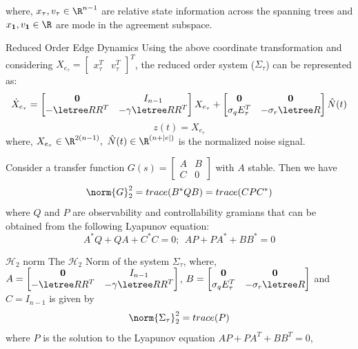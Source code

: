 \begin{frame}
\begin{lemma}
					where, $x_\tau,v_\tau \in \R^{n-1}$ are relative state information across the spanning trees and $x_{\mathbf{1}}, v_{\mathbf{1}} \in \R$ are mode in the agreement subspace. 
				\end{lemma}	
				\begin{block}{Reduced Order Edge Dynamics}
					 Using the above coordinate transformation and considering ${X}_{e_\tau}=\begin{bmatrix}
					 	x_\tau^T & v_\tau^T \end{bmatrix}^T$, the reduced order system ($\Sigma_{\tau}$) can be represented as:
					$$\dot{X}_{e_\tau}=\begin{bmatrix}
						\mathbf{0} & I_{n-1}\\
						-\letree RR^T & -\gamma\letree RR^T
					\end{bmatrix}X_{e_\tau}+\begin{bmatrix}
						\mathbf{0} & \mathbf{0}\\
						\sigma_{q}E_{\tau}^T & -\sigma_{r}\letree R
					\end{bmatrix}\hat{N}(t)$$
					$$z(t)=X_{e_\tau}$$
					where, ${X}_{e_\tau} \in \R^{2(n-1)},~\hat{N}(t) \in \R^{(n+|e|)} $ is the normalized noise signal.
				\end{block}
			\end{frame}
\begin{frame}{}
	\begin{defi}
		Consider a transfer function $G(s)=\left[
		\begin{array}{c|c}
			A & B \\
			\hline
			C & 0
		\end{array}
		\right]$
		with $A$ stable. Then we have $$\norm{G}_2^2=trace(B^*QB)=trace(CPC^*)$$
		where $Q$ and $P$ are observability and controllability gramians that can be obtained from the following Lyapunov equation:
		$$A^*Q+QA+C^*C=0;~~AP+PA^*+BB^*=0 $$
	\end{defi}
	\pause
	\begin{block}{$\mathcal{H}_2$ norm}
		The $\mathcal{H}_2$ Norm of the system $\Sigma_{\tau}$, where, $A=\begin{bmatrix}
			\mathbf{0} & I_{n-1}\\
			-\letree RR^T & -\gamma\letree RR^T
		\end{bmatrix}$, $B=\begin{bmatrix}
			\mathbf{0} & \mathbf{0}\\
			\sigma_{q}E_{\tau}^T & -\sigma_{r}\letree R
		\end{bmatrix}$ and $C=I_{n-1}$ is given by $$\norm{\Sigma_{\tau}}_2^2=trace(P)$$
		where $P$ is the solution to the Lyapunov equation $AP+PA^T+BB^T=0,$
	\end{block}							
\end{frame}

